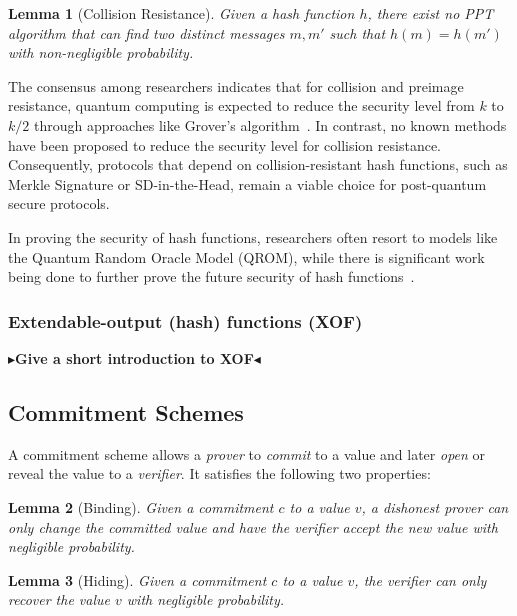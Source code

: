 \documentclass[twoside,11pt]{report}
\theoremstyle{definition}
\theoremstyle{plain}
\newtheorem{lemma}{Lemma}[section]
\newcommand{\todo}[1]{{\color[rgb]{.5,0,0}\textbf{$\blacktriangleright$#1$\blacktriangleleft$}}}
\begin{document}
\begin{lemma}[Collision Resistance]\label{lem:collision}
  Given a hash function $h$, there exist no PPT algorithm that can find two distinct messages $m, m'$ such that $h(m) = h(m')$ with non-negligible probability.
\end{lemma}

The consensus among researchers indicates that for collision and preimage resistance, quantum computing is expected to reduce the security level from $k$ to $k/2$ through approaches like Grover's algorithm~\cite{nielsen2010quantumgrover}. In contrast, no known methods have been proposed to reduce the security level for collision resistance. Consequently, protocols that depend on collision-resistant hash functions, such as Merkle Signature or SD-in-the-Head, remain a viable choice for post-quantum secure protocols.

In proving the security of hash functions, researchers often resort to models like the Quantum Random Oracle Model (QROM), while there is significant work being done to further prove the future security of hash functions~\cite{dtuPostquantumSecurity}.

\subsubsection{Extendable-output (hash) functions (XOF)}\label{sec:xof}
\todo{Give a short introduction to XOF}

\subsection{Commitment Schemes}
A commitment scheme allows a \textit{prover} to \textit{commit} to a value and later \textit{open} or reveal the value to a \textit{verifier}. It satisfies the following two properties:

\begin{lemma}[Binding]\label{lem:binding}
  Given a commitment $c$ to a value $v$, a dishonest prover can only change the committed value and have the verifier accept the new value with negligible probability.
\end{lemma}
\begin{lemma}[Hiding]\label{lem:hiding}
  Given a commitment $c$ to a value $v$, the verifier can only recover the value $v$ with negligible probability.
\end{lemma}
\end{document}
